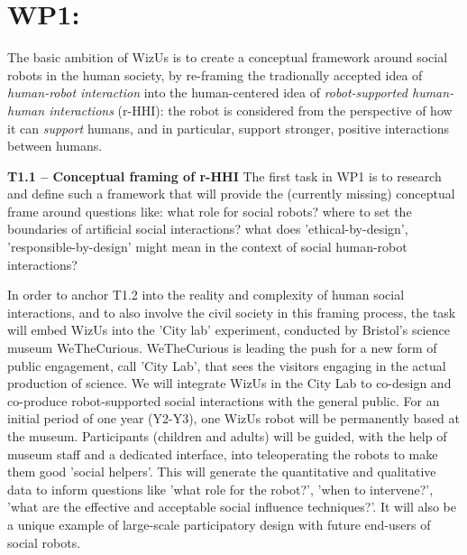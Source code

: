 \documentclass[11pt,a4paper]{report}
\newcommand{\project}{WizUs\xspace}
\begin{document}
\begin{landscape}

\end{landscape}

\newpage



\section{WP1: \textbf{\wpOne}}

\noindent{}

The basic ambition of \project is to create a conceptual framework around social
robots in the human society, by re-framing the tradionally accepted idea of
\emph{human-robot interaction} into the human-centered idea of
\emph{robot-supported human-human interactions} (r-HHI): the robot is considered
from the perspective of how it can \emph{support} humans, and in particular,
support stronger, positive interactions between humans.

\textbf{T1.1 -- Conceptual framing of r-HHI} The first task in WP1 is to research and
define such a framework that will provide the (currently missing) conceptual
frame around questions like: what role for social robots? where to set the
boundaries of artificial social interactions? what does 'ethical-by-design',
'responsible-by-design' might mean in the context of social human-robot
interactions? 

In order to anchor T1.2 into the reality and complexity of human social
interactions, and to also involve the civil society in this framing process, the
task will embed \project into the 'City lab' experiment, conducted by Bristol's
science museum WeTheCurious. WeTheCurious is leading the push for a new form of
public engagement, call 'City Lab', that sees the visitors engaging in the
actual production of science. We will integrate \project in the City Lab to
co-design and co-produce robot-supported social interactions with the general
public. For an initial period of one year (Y2-Y3), one \project robot will be
permanently based at the museum.  Participants (children and adults) will be
guided, with the help of museum staff and a dedicated interface, into
teleoperating the robots to make them good 'social helpers'. This will generate
the quantitative and qualitative data to inform questions like 'what role for
the robot?', 'when to intervene?', 'what are the effective and acceptable social
influence techniques?'. It will also be a unique example of large-scale
participatory design with future end-users of social robots.
\end{document}
